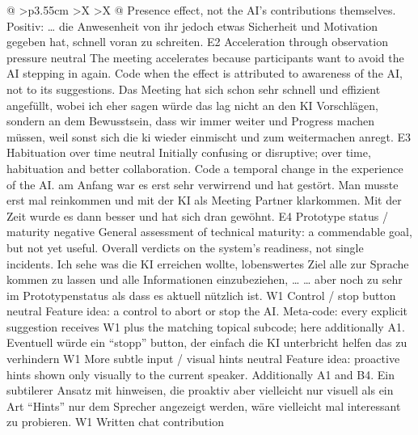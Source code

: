 \begin{xltabular}{\textwidth}{@{}
      >{\RaggedRight\arraybackslash}p{3.55cm}
      >{\RaggedRight\arraybackslash}X
      >{\RaggedRight\arraybackslash}X
    @{}}
      {Presence effect, not the AI's contributions themselves.}
      {Positiv: … die Anwesenheit von ihr jedoch etwas Sicherheit und Motivation
      gegeben hat, schnell voran zu schreiten.}
    \cbgap
    \cbrow
      {E2}
      {Acceleration through observation pressure}
      {neutral}
      {The meeting accelerates because participants want to avoid the AI stepping in
      again.}
      {Code when the effect is attributed to awareness of the AI, not to its
      suggestions.}
      {Das Meeting hat sich schon sehr schnell und effizient angefüllt, wobei ich
      eher sagen würde das lag nicht an den KI Vorschlägen, sondern an dem
      Bewusstsein, dass wir immer weiter und Progress machen müssen, weil sonst
      sich die ki wieder einmischt und zum weitermachen anregt.}
    \cbgap
    \cbrow
      {E3}
      {Habituation over time}
      {neutral}
      {Initially confusing or disruptive; over time, habituation and better
      collaboration.}
      {Code a temporal change in the experience of the AI.}
      {am Anfang war es erst sehr verwirrend und hat gestört. Man musste erst mal
      reinkommen und mit der KI als Meeting Partner klarkommen. Mit der Zeit wurde
      es dann besser und hat sich dran gewöhnt.}
    \cbgap
    \cbrow
      {E4}
      {Prototype status / maturity}
      {negative}
      {General assessment of technical maturity: a commendable goal, but not yet
      useful.}
      {Overall verdicts on the system's readiness, not single incidents.}
      {Ich sehe was die KI erreichen wollte, lobenswertes Ziel alle zur Sprache
      kommen zu lassen und alle Informationen einzubeziehen, … … aber noch zu sehr
      im Prototypenstatus als dass es aktuell nützlich ist.}
    \cbcatbreak
    \cbrow
      {W1}
      {Control / stop button}
      {neutral}
      {Feature idea: a control to abort or stop the AI.}
      {Meta-code: every explicit suggestion receives W1 plus the matching topical
      subcode; here additionally A1.}
      {Eventuell würde ein \enquote{stopp} button, der einfach die KI unterbricht
      helfen das zu verhindern}
    \cbgap
    \cbrow
      {W1}
      {More subtle input / visual hints}
      {neutral}
      {Feature idea: proactive hints shown only visually to the current speaker.}
      {Additionally A1 and B4.}
      {Ein subtilerer Ansatz mit hinweisen, die proaktiv aber vielleicht nur visuell
      als ein Art \enquote{Hints} nur dem Sprecher angezeigt werden, wäre vielleicht
      mal interessant zu probieren.}
    \cbgap
    \cbrow
      {W1}
      {Written chat contribution}

\end{xltabular}
